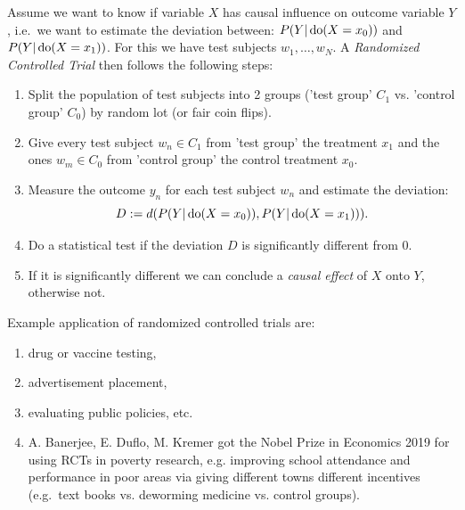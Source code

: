 \begin{Prn}\label{prn:rct}
 Assume we want to know if variable $X$ has causal influence on outcome variable $Y$, i.e.\ we want to estimate the deviation between:
$ P(Y|\operatorname{do}(X=x_0))$ and  $P(Y|\operatorname{do}(X=x_1))$. For this we have test subjects $w_1,\dots,w_N$.
A \emph{Randomized Controlled Trial} then follows the following steps:
\begin{enumerate}
    \item Split the population of test subjects into 2 groups ('test group' $C_1$ vs. 'control group' $C_0$) by random lot (or fair coin flips).
    \item Give every test subject $w_n \in C_1$ from 'test group' the treatment $x_1$ and the ones  $w_m \in C_0$ from 'control group' the control treatment $x_0$.
    \item Measure the outcome $y_n$ for each test subject $w_n$ and estimate the deviation: \[D:=d(P(Y|\operatorname{do}(X=x_0)),P(Y|\operatorname{do}(X=x_1))).\]
    \item Do a statistical test if the deviation $D$ is significantly different from $0$. 
    \item If it is significantly different we can conclude a \emph{causal effect} of $X$ onto $Y$, otherwise not.
\end{enumerate}
\end{Prn}


\begin{Eg}
    Example application of randomized controlled trials are:
    \begin{enumerate}
        \item drug or vaccine testing,
        \item advertisement placement,
        \item evaluating public policies, etc.
        \item A. Banerjee, E. Duflo, M. Kremer got the Nobel Prize in Economics 2019 for using RCTs in poverty research, e.g.\: improving school attendance and performance in poor areas via giving different towns different incentives (e.g.\ text books vs. deworming medicine vs. control groups).
    \end{enumerate}
\end{Eg}

